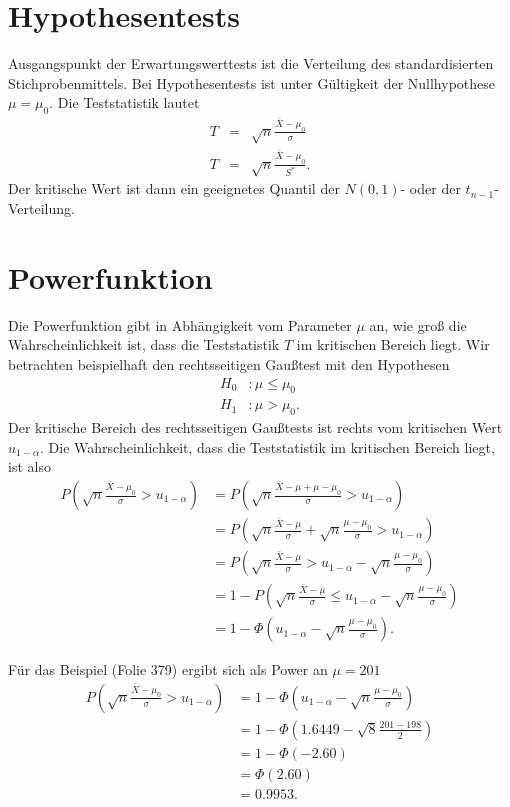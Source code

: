 \documentclass{article}
\begin{document}
\section*{Hypothesentests}
Ausgangspunkt der Erwartungswerttests ist die Verteilung 
des standardisierten Stichprobenmittels.
Bei Hypothesentests ist unter G\"{u}ltigkeit der Nullhypothese $\mu =\mu_0$. 
Die Teststatistik lautet
\begin{eqnarray*}
T &=&\sqrt{n}\frac{\bar{X}-\mu_0}{\sigma } \\
T &=&\sqrt{n}\frac{\bar{X}-\mu_0}{S^{\ast }}.
\end{eqnarray*}
Der kritische Wert ist dann ein geeignetes Quantil der $N(0,1)$- oder der 
$t_{n-1}$-Verteilung.

\section*{Powerfunktion}
Die Powerfunktion gibt in Abhängigkeit vom Parameter $\mu$ an, wie groß die 
Wahrscheinlichkeit ist, dass die Teststatistik $T$ im kritischen Bereich liegt.
Wir betrachten beispielhaft den rechtsseitigen Gaußtest mit den Hypothesen
\begin{align*}
H_0 &: \mu\le\mu_0\\
H_1 &: \mu > \mu_0.
\end{align*}
Der kritische Bereich des rechtsseitigen Gaußtests ist rechts vom
kritischen Wert $u_{1-\alpha}$. Die Wahrscheinlichkeit, dass die
Teststatistik im kritischen Bereich liegt, ist also
\begin{align*}
P\left(\sqrt{n}\frac{\bar X-\mu_0}{\sigma}>u_{1-\alpha}\right) &=
P\left(\sqrt{n}\frac{\bar X-\mu+\mu-\mu_0}{\sigma}>u_{1-\alpha}\right)\\
&=P\left(\sqrt{n}\frac{\bar X-\mu}{\sigma}+\sqrt{n}\frac{\mu-\mu_0}{\sigma}>u_{1-\alpha}\right)\\
&=P\left(\sqrt{n}\frac{\bar X-\mu}{\sigma}>u_{1-\alpha}-\sqrt{n}\frac{\mu-\mu_0}{\sigma}\right)\\
&=1-P\left(\sqrt{n}\frac{\bar X-\mu}{\sigma}\le u_{1-\alpha}-\sqrt{n}\frac{\mu-\mu_0}{\sigma}\right)\\
&=1-\Phi\left(u_{1-\alpha}-\sqrt{n}\frac{\mu-\mu_0}{\sigma}\right).
\end{align*}

Für das Beispiel (Folie 379) ergibt sich als Power an $\mu=201$
\begin{align*}
P\left(\sqrt{n}\frac{\bar X-\mu_0}{\sigma}>u_{1-\alpha}\right) &=
1-\Phi\left(u_{1-\alpha}-\sqrt{n}\frac{\mu-\mu_0}{\sigma}\right)\\
&=1-\Phi\left(1.6449-\sqrt{8}\frac{201-198}{2}\right)\\
&=1-\Phi(-2.60)\\
&=\Phi(2.60)\\
&=0.9953.
\end{align*}
\end{document}
